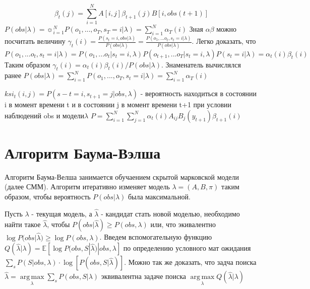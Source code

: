 \documentclass[a4paper,12pt]{article}
\DeclareMathOperator*{\argmax}{arg\,max}
\begin{document}
			\[ \beta_t(j) =  \sum_{i=1}^{N} A[i, j]\beta_{t+1}(j)B[i, obs(t+1)]\]
			$P(obs | \lambda) = \sun_{i=1}^{N} P(o_1, ... , o_T, s_T = i | \lambda) = \sum_{i=1}^{N} \alpha_{T}(i)$
					Зная $\alpha \beta$ можно посчитать величину $\gamma_t(i) = \frac{P(s_t = i, obs | \lambda)}{P(obs | \lambda)} = 
		\frac{P(o_1, ... o_t, s_t = i | \lambda)}{P(obs | \lambda)}.$ Легко доказать, что $P(o_1, ... o_t, s_t = i | \lambda) = 
		P(o_1, ... o_t | s_t = i, \lambda)P(o_{t+1}, ... o_T | s_t = i, \lambda)P(s_t = i | \lambda) = \alpha_t(i)\beta_t(i)$
		Таким образом $\gamma_t(i) = \alpha_t(i) \beta_t(i) / P(obs | \lambda)$. Знаменатель вычислялся ранее
		$P(obs|\lambda) = \sum_{i=1}^{N} P(o_1, ... , o_T, s_t = i | \lambda) = \sum_{i=1}^{N} \alpha_T(i)$
		
				$ksi_t(i , j) = P(s-t = i, s_{t+1} = j | obs, \lambda)$ - вероятность находиться в состоянии i в момент времени t и в состоянии j в
		момент времени t+1 при условии наблюдений obs и модели$ \lambda$
		$P = \sum_{i=1}^{N}\sum_{j=1}^{N} \alpha_t(i)A_{ij}B_j(y_{t+1})\beta_{t+1}(i)$
		

\section{Алгоритм Баума-Вэлша}

Алгоритм Баума-Велша занимается обучаением скрытой марковской модели (далее СММ). Алгоритм итеративно изменяет модель $\lambda = (A, B, \pi)$  таким образом, чтобы вероятность $P(obs | \lambda)$ была максимальной.

Пусть $\lambda$ - текущая модель, а $\widehat{\lambda}$ - кандидат стать новой моделью, необходимо найти такое $\widehat{\lambda}$, чтобы $P(obs |\widehat{\lambda} ) \geq P(obs, \lambda)$ или, что экивалентно $\log{P(obs |\widehat{\lambda} }) \geq \log {P(obs, \lambda)}$. Введем вспомогательную функцию  $Q(\widehat{\lambda} | \lambda) = \mathbb{E}\left[\log P(obs, S | \widehat{\lambda}) | obs, \lambda\right]$ по определению условного мат ожидания  $\sum_{s} P(S | obs, \lambda) \cdot \log \left[P(obs, S | \widehat{\lambda})\right]$. Можно так же доказать, что задча поиска $\widehat{\lambda} = \argmax\limits_{\lambda} \sum_{s} P(obs, S | \lambda)$ эквивалентна задаче поиска $\argmax\limits_{\lambda} Q(\widehat{\lambda} | \lambda)$
\end{document}
